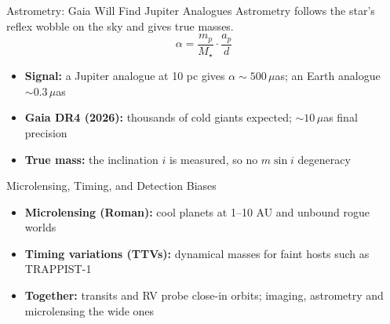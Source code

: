 \documentclass[aspectratio=169, 11pt]{beamer}
\begin{document}
\begin{frame}
\end{frame}

\begin{frame}
\end{frame}

\begin{frame}{Astrometry: Gaia Will Find Jupiter Analogues}
  Astrometry follows the star's reflex wobble on the sky and gives true masses.
  \[
    \alpha = \frac{m_p}{M_\star}\cdot\frac{a_p}{d}
  \]
  \begin{itemize}\setlength\itemsep{3pt}
    \item \textbf{Signal:} a Jupiter analogue at 10 pc gives $\alpha \sim 500\,\mu$as; an Earth analogue $\sim 0.3\,\mu$as
    \item \textbf{Gaia DR4 (2026):} thousands of cold giants expected; $\sim 10\,\mu$as final precision
    \item \textbf{True mass:} the inclination $i$ is measured, so no $m \sin i$ degeneracy
  \end{itemize}
\end{frame}

\begin{frame}
\end{frame}

\begin{frame}{Microlensing, Timing, and Detection Biases}
  \begin{itemize}\setlength\itemsep{4pt}
    \item \textbf{Microlensing (Roman):} cool planets at 1--10 AU and unbound rogue worlds
    \item \textbf{Timing variations (TTVs):} dynamical masses for faint hosts such as TRAPPIST-1
    \item \textbf{Together:} transits and RV probe close-in orbits; imaging, astrometry and microlensing the wide ones
  \end{itemize}
  \vskip8pt
\end{frame}
\end{document}
